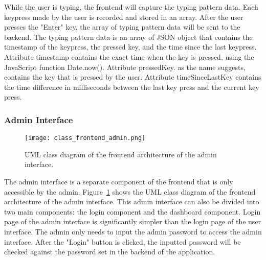 While the user is typing, the frontend will capture the typing pattern data.
Each keypress made by the user is recorded and stored in an array.
After the user presses the "Enter" key, the array of typing pattern data will be sent to the backend.
The typing pattern data is an array of JSON object that contains the timestamp of the keypress, the pressed key, and the time since the last keypress.
Attribute timestamp contains the exact time when the key is pressed, using the JavaScript function Date.now().
Attribute pressedKey. as the name suggests, contains the key that is pressed by the user.
Attribute timeSinceLastKey contains the time difference in milliseconds between the last key press and the current key press.


\subsubsection{Admin Interface}

\begin{figure}[h!]
    \centering
    \texttt{[image: class\_frontend\_admin.png]}
    \caption{UML class diagram of the frontend architecture of the admin interface.}
    \label{class_frontend_admin}
\end{figure}

The admin interface is a separate component of the frontend that is only accessible by the admin.
Figure~\ref{class_frontend_admin} shows the UML class diagram of the frontend architecture of the admin interface.
This admin interface can also be divided into two main components: the login component and the dashboard component.
Login page of the admin interface is significantly simpler than the login page of the user interface.
The admin only needs to input the admin password to access the admin interface.
After the "Login" button is clicked, the inputted password will be checked against the password set in the backend of the application.


